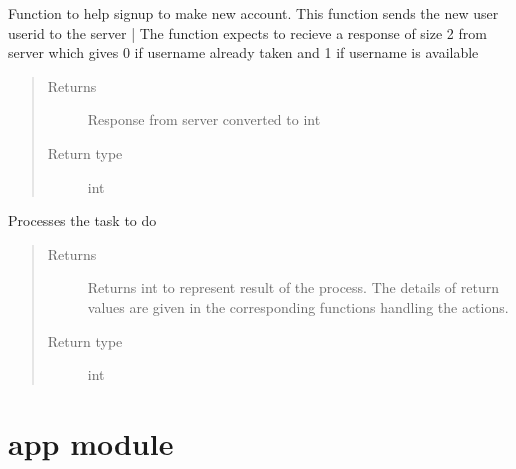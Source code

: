 \documentclass[letterpaper,10pt,english]{sphinxmanual}
\begin{document}
\begin{fulllineitems}
\begin{fulllineitems}
\label{\detokenize{Message:Message.Message._signupuid}}
Function to help signup to make new account. This function sends the new user userid to the server |
The function expects to recieve a response of size 2 from server which gives 0 if username already taken and 1 if username is available
\begin{quote}\begin{description}
\item[{Returns}] \leavevmode
Response from server converted to int

\item[{Return type}] \leavevmode
int

\end{description}\end{quote}

\end{fulllineitems}


\begin{fulllineitems}
\label{\detokenize{Message:Message.Message.processTask}}
Processes the task to do
\begin{quote}\begin{description}
\item[{Returns}] \leavevmode
Returns int to represent result of the process. The details of return values are given in the corresponding functions handling the actions.

\item[{Return type}] \leavevmode
int

\end{description}\end{quote}

\end{fulllineitems}


\end{fulllineitems}



\section{app module}
\label{\detokenize{app:module-app}}\label{\detokenize{app:app-module}}\label{\detokenize{app::doc}}
\end{document}

